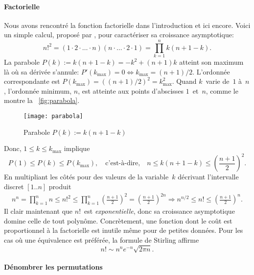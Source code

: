 \paragraph{Factorielle}

Nous avons rencontré la fonction factorielle dans l'introduction et
ici encore. Voici un simple calcul, proposé par
\cite{GrahamKnuthPatashnik_1994}, pour caractériser sa croissance
asymptotique:
\begin{equation*}
n!^2 = (1 \cdot 2 \cdot \ldots \cdot n) (n \cdot \ldots \cdot 2 \cdot
1) = \prod_{k=1}^{n}{k(n+1-k)}.
\end{equation*}
La parabole \(P(k) := k(n+1-k) = -k^2 + (n+1)k\) atteint son maximum
là où sa dérivée s'annule: \(P'(k_{\max}) = 0 \Leftrightarrow
k_{\max}=(n+1)/2\). L'ordonnée correspondante est \(P(k_{\max}) =
((n+1)/2)^2 = k_{\max}^2\). Quand \(k\)~varie de~\(1\) à~\(n\),
l'ordonnée minimum, \(n\), est atteinte aux points d'abscisses
\(1\)~et~\(n\), comme le montre la \fig~\vref{fig:parabola}.
\begin{figure}
\centering
\texttt{[image: parabola]}
\caption{Parabole \(P(k) := k(n+1-k)\)}
\label{fig:parabola}
\end{figure}
Donc, \(1 \leqslant k \leqslant k_{\max}\) implique
\begin{equation*}
P(1) \leqslant P(k) \leqslant P(k_{\max}),\quad \text{c'est-à-dire,}
\quad n \leqslant k(n+1-k) \leqslant \left(\frac{n+1}{2}\right)^2.
\end{equation*}
En multipliant les côtés pour des valeurs de la variable~\(k\)
décrivant l'intervalle discret \([1..n]\) produit
\begin{gather*}
n^n = \prod_{k=1}^{n}{n} \leqslant n!^2
\leqslant
\prod_{k=1}^{n}{\left(\!\frac{n+1}{2}\!\right)^2} \!\!=
\left(\!\frac{n+1}{2}\!\right)^{2n}
\!\!\!\Rightarrow\!
n^{n/2} \leqslant n! \leqslant \left(\!\frac{n+1}{2}\!\right)^n.
\end{gather*}
Il clair maintenant que \(n!\)~est \emph{exponentielle}, donc sa
croissance asymptotique domine celle de tout polynôme. Concrètement,
une fonction dont le coût est proportionnel à la factorielle est
inutile même pour de petites données. Pour les cas où une équivalence
est préférée, la formule de Stirling
affirme
\begin{equation}
n! \sim n^n e^{-n} \sqrt{2\pi n}.\label{eq:Stirling}
\end{equation}

\paragraph{Dénombrer les permutations}

